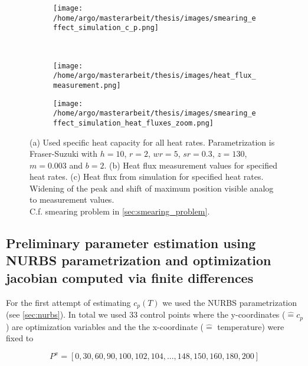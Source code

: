 \documentclass{scrartcl}[12pt, halfparskip]
\numberwithin{equation}{section}
\numberwithin{figure}{section}
\numberwithin{table}{section}
\begin{document}
\begin{figure}[H]
	\centering
	\begin{subfigure}{0.9\textwidth}
		\centering
		\texttt{[image: /home/argo/masterarbeit/thesis/images/smearing\_effect\_simulation\_c\_p.png]}
		\caption{}
		\label{fig:smearing_effect_c_p}
	\end{subfigure} \\
	\begin{subfigure}{0.49\textwidth}
		\texttt{[image: /home/argo/masterarbeit/thesis/images/heat\_flux\_measurement.png]}
		\caption{}
		\label{fig:smearing_effect_measurement_heat_flux}
	\end{subfigure}
	\begin{subfigure}{0.49\textwidth}
		\texttt{[image: /home/argo/masterarbeit/thesis/images/smearing\_effect\_simulation\_heat\_fluxes\_zoom.png]}
		\caption{}
		\label{fig:smearing_effect_simulation_heat_flux}
	\end{subfigure}
	\caption{(a) Used specific heat capacity for all heat rates. Parametrization is Fraser-Suzuki with $h=10$, $r=2$, $wr=5$, $sr=0.3$, $z=130$, $m=0.003$ and $b=2$. (b) Heat flux measurement values for specified heat rates. (c) Heat flux from simulation for specified heat rates. Widening of the peak and shift of maximum position visible analog to measurement values. \\
	C.f. smearing problem in \cref{sec:smearing_problem}.}
\end{figure}



\subsection{Preliminary parameter estimation using NURBS parametrization and optimization jacobian computed via finite differences}
\label{sec:param_estim_NURBS}

For the first attempt of estimating $c_p(T)$  we used the NURBS parametrization (see \cref{sec:nurbs}). In total we used 33 control points where the y-coordinates ($\hat{=} c_p$) are optimization variables and the the x-coordinate ($\hat{=}$ temperature) were fixed to 

\begin{equation}
	P^x = [0, 30, 60, 90, 100, 102, 104, ..., 148, 150, 160, 180, 200]
\end{equation}
\end{document}
